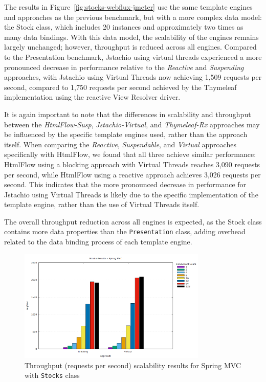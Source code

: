 The results in Figure~\ref{fig:stocks-webflux-jmeter} use the same template
engines and approaches as the previous benchmark, but with a more complex data
model: the Stock class, which includes 20 instances and approximately two times
as many data bindings. With this data model, the scalability of the engines
remains largely unchanged; however, throughput is reduced across all engines.
Compared to the Presentation benchmark, Jstachio using virtual threads
experienced a more pronounced decrease in performance relative to the
\textit{Reactive} and \textit{Suspending} approaches, with Jstachio using
Virtual Threads now achieving 1,509 requests per second, compared to 1,750
requests per second achieved by the Thymeleaf implementation using the reactive
View Resolver driver.

It is again important to note that the differences in scalability and
throughput between the \textit{HtmlFlow-Susp}, \textit{Jstachio-Virtual}, and
\textit{Thymeleaf-Rx} approaches may be influenced by the specific template
engines used, rather than the approach itself. When comparing the
\textit{Reactive}, \textit{Suspendable}, and \textit{Virtual} approaches
specifically with HtmlFlow, we found that all three achieve similar
performance: HtmlFlow using a blocking approach with Virtual Threads reaches
3,090 requests per second, while HtmlFlow using a reactive approach achieves
3,026 requests per second. This indicates that the more pronounced decrease in
performance for Jstachio using Virtual Threads is likely due to the specific
implementation of the template engine, rather than the use of Virtual
Threads itself.

The overall throughput reduction across all engines is expected, as the Stock
class contains more data properties than the \texttt{Presentation} class,
adding overhead related to the data binding process of each template engine.

\begin{figure}[h]
     \centering
     \includegraphics[width=0.8\textwidth]{./Graphs/stocks-springmvc-jmeter.png}
     \caption{Throughput (requests per second) scalability results for Spring MVC with \texttt{Stocks} class}\label{fig:stocks-springmvc-jmeter}
\end{figure}

